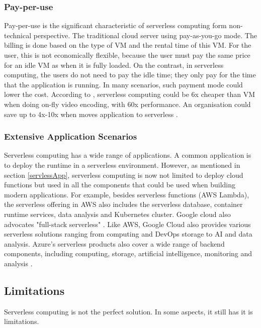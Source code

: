 \subsubsection{Pay-per-use}
Pay-per-use is the significant characteristic of serverless computing form non-technical perspective. The traditional cloud server using pay-as-you-go mode. The billing is done based on the type of VM and the rental time of this VM. For the user, this is not economically flexible, because the user must pay the same price for an idle VM as when it is fully loaded. On the contrast, in serverless computing, the users do not need to pay the idle time; they only pay for the time that the application is running. In many scenarios, such payment mode could lower the cost. According to \cite{jonas2019cloud}, serverless computing could be 6x cheaper than VM when doing on-fly video encoding, with 60x performance. An organisation could save up to 4x-10x when moves application to serverless \cite{jonas2019cloud}\cite{Serverle67:online}.
\subsubsection{Extensive Application Scenarios}
Serverless computing has a wide range of applications. A common application is to deploy the runtime in a serverless environment.
However, as mentioned in section \ref{servlessApp}, serverless computing is now not limited to deploy cloud functions but used in all the components that could be used when building modern applications. 
For example, besides serverless functions (AWS Lambda), the serverless offering in AWS also includes the serverless database, container runtime services, data analysis and Kubernetes cluster. Google cloud also advocates "full-stack serverless" \cite{Serverle29:online}. Like AWS, Google Cloud also provides various serverless solutions ranging from computing and DevOps storage to AI and data analysis. Azure's serverless products also cover a wide range of backend components, including computing, storage, artificial intelligence, monitoring and analysis \cite{AzureSer56:online}.
\subsection{Limitations}
\label{servlesslimitation}
Serverless computing is not the perfect solution. In some aspects, it still has it is limitations.
